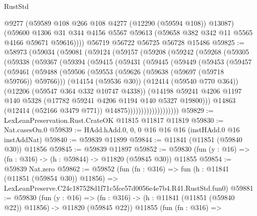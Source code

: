 \begin{lexlean}{RustStd}
\begin{coremodule}
        @9277
        (@59589 @108 @266 @108 @4277 (@12290 (@59594 @108)) @13087)
        (@59600
          @1306
          @31
          @344
          @4156
          @5567
          @59613
          (@59658 @382 @342 @11 @5565 @4166 @59671 @59616))))
    @56719
    @56722
    @56725
    @56728
    @15486
@59825 := @58973
    (@59034
      (@59081
        (@59124
          (@59157
            (@59208
              (@59242
                (@59268
                  (@59305
                    (@59338
                      (@59367
                        (@59394
                          (@59415
                            (@59431
                              (@59445
                                (@59449
                                  (@59453
                                    (@59457
                                      (@59461
                                        (@59488
                                          (@59506
                                            (@59553
                                              (@59626 (@59638 (@59697 (@59718 @59766)) @59766)))
                                            (@14154 (@59536 @30))
                                            (@12414 (@59540 @770 @364))
                                            (@12206 (@59547 @364 @332 @10747 @4338))
                                            (@14198
                                              @59241
                                              @4206
                                              @1197
                                              @140
                                              @5328
                                              (@17782 @59241 @4206 @1194 @140 @5327 @19800)))
                                          @14863
                                          (@12414 (@52166 @3479 @771))
                                          @14875)))))))))))))))))))
@59829 := LexLeanPreservation.Rust.CrateOK @11815 @11817 @11819
@59830 := Nat.casesOn.{0}
@59839 := HAdd.hAdd.{0, 0, 0} @16 @16 @16 (instHAdd.{0} @16 instAddNat)
@59840 := @59839 @11899
@59844 := @11841 (@11851 (@59840 @30)) @11856
@59845 := @59839 @11897
@59852 := @59830 (fun (y : @16) => (fn : @316) -> (h : @59844) -> @11820 (@59845 @30)) @11855
@59854 := @59839 Nat.zero
@59862 := @59852
    (fun (fn : @316) =>
    fun (h : @11841 (@11851 (@59854 @30)) @11856) =>
    LexLeanPreserve.C24c187528d1f71c5fce57d0056e4e7b4.R41.RustStd.fun0)
@59881 := @59830
    (fun (y : @16) =>
    (fn : @316) -> (h : @11841 (@11851 (@59840 @22)) @11856) -> @11820 (@59845 @22))
    @11855
    (fun (fn : @316) =>

\end{coremodule}
\end{lexlean}

